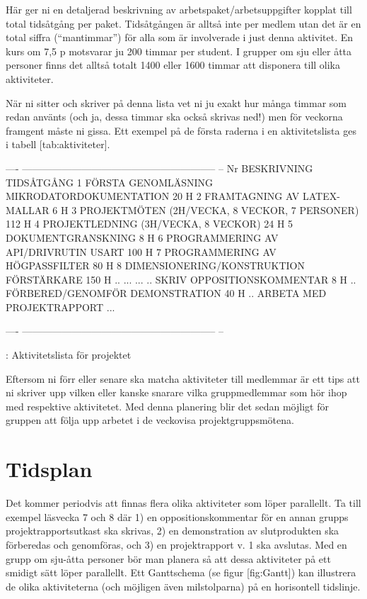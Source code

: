 \documentclass[a4paper]{article}
\begin{document}
Här ger ni en detaljerad beskrivning av arbetspaket/arbetsuppgifter
kopplat till total tidsåtgång per paket. Tidsåtgången är alltså inte per
medlem utan det är en total siffra (“mantimmar”) för alla som är
involverade i just denna aktivitet. En kurs om 7,5 p motsvarar ju 200
timmar per student. I grupper om sju eller åtta personer finns det
alltså totalt 1400 eller 1600 timmar att disponera till olika
aktiviteter.

När ni sitter och skriver på denna lista vet ni ju exakt hur många
timmar som redan använts (och ja, dessa timmar ska också skrivas ned!)
men för veckorna framgent måste ni gissa. Ett exempel på de första
raderna i en aktivitetslista ges i tabell [tab:aktiviteter].

  ---- ----------------------------------------------------------- --
  Nr   BESKRIVNING  TIDSÅTGÅNG                                    
       1  FÖRSTA GENOMLÄSNING MIKRODATORDOKUMENTATION  20 H      
       2  FRAMTAGNING AV LATEX-MALLAR  6 H                       
       3  PROJEKTMÖTEN (2H/VECKA, 8 VECKOR, 7 PERSONER)  112 H   
       4  PROJEKTLEDNING (3H/VECKA, 8 VECKOR)  24 H              
       5  DOKUMENTGRANSKNING  8 H                                
       6  PROGRAMMERING AV API/DRIVRUTIN USART  100 H            
       7  PROGRAMMERING AV HÖGPASSFILTER  80 H                   
       8  DIMENSIONERING/KONSTRUKTION FÖRSTÄRKARE  150 H         
       ..  ...  ...                                              
       ..  SKRIV OPPOSITIONSKOMMENTAR  8 H                       
       ..  FÖRBERED/GENOMFÖR DEMONSTRATION  40 H                 
       ..  ARBETA MED PROJEKTRAPPORT  ...                        
                                                                   
  ---- ----------------------------------------------------------- --

  : Aktivitetslista för projektet

Eftersom ni förr eller senare ska matcha aktiviteter till medlemmar är
ett tips att ni skriver upp vilken eller kanske snarare vilka
gruppmedlemmar som hör ihop med respektive aktivitetet. Med denna
planering blir det sedan möjligt för gruppen att följa upp arbetet i de
veckovisa projektgruppsmötena.



\section{Tidsplan}


Det kommer periodvis att finnas flera olika aktiviteter som löper
parallellt. Ta till exempel läsvecka 7 och 8 där 1) en
oppositionskommentar för en annan grupps projektrapportsutkast ska
skrivas, 2) en demonstration av slutprodukten ska förberedas och
genomföras, och 3) en projektrapport v. 1 ska avslutas. Med en grupp om
sju-åtta personer bör man planera så att dessa aktiviteter på ett
smidigt sätt löper parallellt. Ett Ganttschema (se figur [fig:Gantt])
kan illustrera de olika aktiviteterna (och möjligen även milstolparna)
på en horisontell tidslinje.
\end{document}

